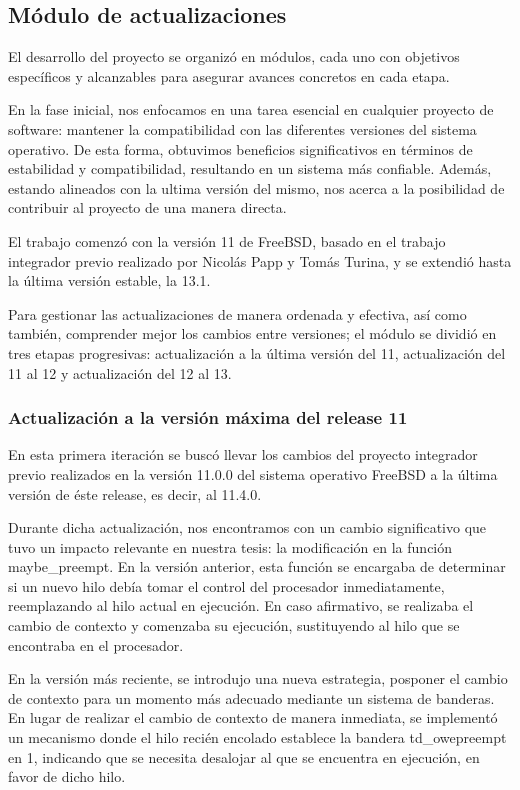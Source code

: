 \subsection{Módulo de actualizaciones}

El desarrollo del proyecto se organizó en módulos, cada uno con objetivos específicos y alcanzables para asegurar avances concretos en cada etapa.

En la fase inicial, nos enfocamos en una tarea esencial en cualquier proyecto de software: mantener la compatibilidad con las diferentes versiones del sistema operativo. De esta forma, obtuvimos beneficios significativos en términos de estabilidad y compatibilidad, resultando en un sistema más confiable. Además, estando alineados con la ultima versión del mismo, nos acerca a la posibilidad de contribuir al proyecto de una manera directa.

El trabajo comenzó con la versión 11 de FreeBSD, basado en el trabajo integrador previo realizado por Nicolás Papp y Tomás Turina, y se extendió hasta la última versión estable, la 13.1.

Para gestionar las actualizaciones de manera ordenada y efectiva, así como también, comprender mejor los cambios entre versiones; el módulo se dividió en tres etapas progresivas: actualización a la última versión del 11, actualización del 11 al 12 y actualización del 12 al 13.


\subsubsection{Actualización a la versión máxima del release 11}

En esta primera iteración se buscó llevar los cambios del proyecto integrador previo realizados en la versión 11.0.0 del sistema operativo FreeBSD a la última versión de éste release, es decir, al 11.4.0.\par

Durante dicha actualización, nos encontramos con un cambio significativo que tuvo un impacto relevante en nuestra tesis: la modificación en la función maybe\_preempt. En la versión anterior, esta función se encargaba de determinar si un nuevo hilo debía tomar el control del procesador inmediatamente, reemplazando al hilo actual en ejecución. En caso afirmativo, se realizaba el cambio de contexto y comenzaba su ejecución, sustituyendo al hilo que se encontraba en el procesador.\par

En la versión más reciente, se introdujo una nueva estrategia, posponer el cambio de contexto para un momento más adecuado mediante un sistema de banderas. En lugar de realizar el cambio de contexto de manera inmediata, se implementó un mecanismo donde el hilo recién encolado establece la bandera td\_owepreempt en 1, indicando que se necesita desalojar al que se encuentra en ejecución, en favor de dicho hilo.\par

